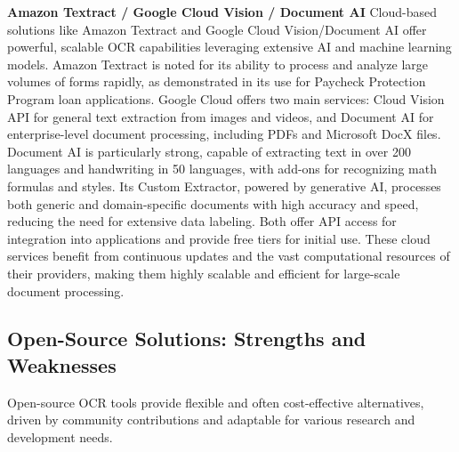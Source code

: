 \textbf{Amazon Textract / Google Cloud Vision / Document AI}
Cloud-based solutions like Amazon Textract and Google Cloud Vision/Document AI offer powerful, scalable OCR capabilities leveraging extensive AI and machine learning models. Amazon Textract is noted for its ability to process and analyze large volumes of forms rapidly, as demonstrated in its use for Paycheck Protection Program loan applications. Google Cloud offers two main services: Cloud Vision API for general text extraction from images and videos, and Document AI for enterprise-level document processing, including PDFs and Microsoft DocX files. Document AI is particularly strong, capable of extracting text in over 200 languages and handwriting in 50 languages, with add-ons for recognizing math formulas and styles. Its Custom Extractor, powered by generative AI, processes both generic and domain-specific documents with high accuracy and speed, reducing the need for extensive data labeling. Both offer API access for integration into applications and provide free tiers for initial use. These cloud services benefit from continuous updates and the vast computational resources of their providers, making them highly scalable and efficient for large-scale document processing.

\subsection{Open-Source Solutions: Strengths and Weaknesses}

Open-source OCR tools provide flexible and often cost-effective alternatives, driven by community contributions and adaptable for various research and development needs.

